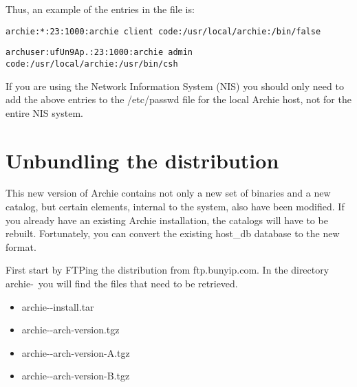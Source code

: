 Thus, an example of the entries in the  file is:

\texttt{archie:*:23:1000:archie client code:/usr/local/archie:/bin/false}

\texttt{archuser:ufUn9Ap.:23:1000:archie admin code:/usr/local/archie:/usr/bin/csh}


If you are using the Network Information System (NIS) you should only need to
add the above entries to the /etc/passwd file for the local Archie host, not
for the entire NIS system.






%
%
%

\section{Unbundling the distribution}

This new version of Archie contains not only a new set of binaries and a new
catalog, but certain elements, internal to the system, also have been modified.
If you already have an existing Archie installation, the catalogs will
have to be rebuilt. \new Fortunately, you can convert the existing host\_db database
to the new format.

\new 


First start by FTPing the distribution from ftp.bunyip.com. In the directory
archie-\version \ you will find the files that need to be retrieved.

\begin{itemize}
\item archie-\version-install.tar 
\item archie-\version-arch-version.tgz 
\item archie-\version-arch-version-A.tgz 
\item archie-\version-arch-version-B.tgz
\end{itemize}

